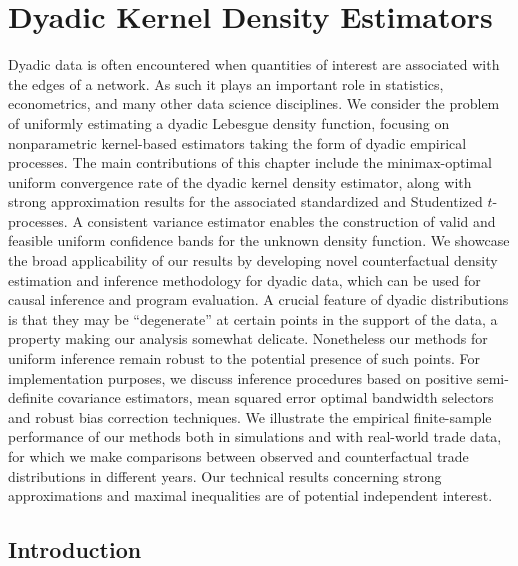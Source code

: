 
\chapter{Dyadic Kernel Density Estimators}
\label{ch:kernel}

Dyadic data is often encountered when quantities of interest are associated
with the edges of a network. As such it plays an important role in statistics,
econometrics, and many other data science disciplines. We consider the problem
of uniformly estimating a dyadic Lebesgue density function, focusing on
nonparametric kernel-based estimators taking the form of dyadic empirical
processes. The main contributions of this chapter
include the minimax-optimal uniform
convergence rate of the dyadic kernel density estimator, along with strong
approximation results for the associated standardized and Studentized
$t$-processes. A consistent variance estimator enables the construction of
valid and feasible uniform confidence bands for the unknown density function.
We showcase the broad applicability of our results by developing novel
counterfactual density estimation and inference methodology for dyadic data,
which can be used for causal inference and program evaluation. A crucial
feature of dyadic distributions is that they may be ``degenerate'' at certain
points in the support of the data, a property making our analysis somewhat
delicate. Nonetheless our methods for uniform inference remain robust to the
potential presence of such points. For implementation purposes, we discuss
inference procedures based on positive semi-definite covariance estimators,
mean squared error optimal bandwidth selectors and robust bias correction
techniques. We illustrate the empirical finite-sample performance of our
methods both in simulations and with real-world trade data, for which we make
comparisons between observed and counterfactual trade distributions in
different years. Our technical results concerning strong approximations and
maximal inequalities are of potential independent interest.

\section{Introduction}
\label{sec:kernel_introduction}


